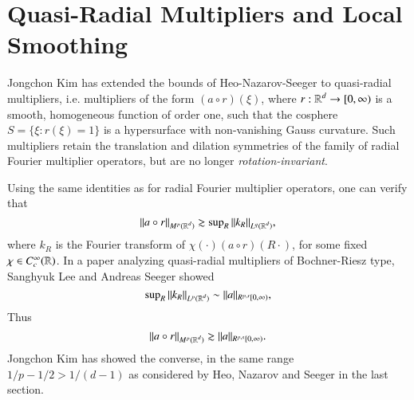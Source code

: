 %
%






\section{Quasi-Radial Multipliers and Local Smoothing}

Jongchon Kim \cite{KimQuasiradial} has extended 
the bounds of Heo-Nazarov-Seeger to quasi-radial multipliers, i.e. multipliers of the form $(a \circ r)(\xi)$, where $r: \operatorname{\mathbb{R}}^d \to [0,\infty)$ is a smooth, homogeneous function of order one, such that the cosphere $S = \{ \xi : r(\xi) = 1 \}$ is a hypersurface with non-vanishing Gauss curvature. Such multipliers retain the translation and dilation symmetries of the family of radial Fourier multiplier operators, but are no longer \emph{rotation-invariant}.

Using the same identities as for radial Fourier multiplier operators, one can verify that
%
\begin{equation}
  \| a \circ r \|_{M^p(\operatorname{\mathbb{R}}^d)} \gtrsim \sup\nolimits_R \| k_R \|_{L^q(\operatorname{\mathbb{R}}^d)},
\end{equation}
%
where $k_R$ is the Fourier transform of $\chi(\cdot) (a \circ r)(R \cdot)$, for some fixed $\chi \in C_c^\infty(\operatorname{\mathbb{R}})$. In a paper analyzing quasi-radial multipliers of Bochner-Riesz type, Sanghyuk Lee and Andreas Seeger \cite{LeeSeeger2} showed
%
\begin{equation}
  \sup\nolimits_R \| k_R \|_{L^p(\operatorname{\mathbb{R}}^d)} \sim \| a \|_{R^{p,s}[0,\infty)},
\end{equation}
%
Thus
%
\begin{equation} \label{auiwodjawiodjawoi2342342}
  \| a \circ r \|_{M^p(\operatorname{\mathbb{R}}^d)} \gtrsim \| a \|_{R^{p,s}[0,\infty)}.
\end{equation}
%
Jongchon Kim \cite{KimQuasiradial} has showed the converse, in the same range $1/p - 1/2 > 1/(d-1)$ as considered by Heo, Nazarov and Seeger in the last section.


